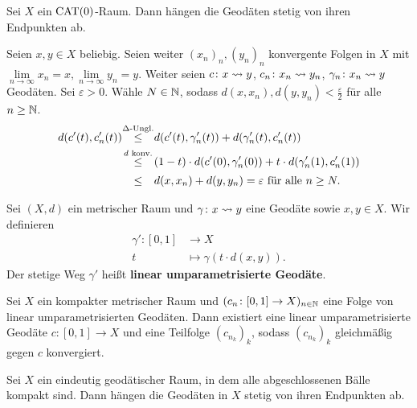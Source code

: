 \begin{satz}
\label{satz:2.18}
	Sei $X$ ein $\operatorname{CAT(0)}$-Raum.
	Dann hängen die Geodäten stetig von ihren Endpunkten ab.
\end{satz}

\begin{beweis}
	Seien $x,y \in X$ beliebig.
	Seien weiter $(x_n)_n, (y_n)_n$ konvergente Folgen in $X$ mit $\lim\limits_{n \rightarrow \infty} x_n = x, \lim\limits_{n \rightarrow \infty} y_n = y$.
	Weiter seien $c \colon x \rightsquigarrow y$, $c_n\colon x_n \rightsquigarrow y_n$, $\gamma_n \colon x_n \rightsquigarrow y$ Geodäten.
	Sei $\varepsilon > 0$.
	Wähle $N \in \mathbb{N}$, sodass $d(x,x_n), d(y,y_n) < \frac{\varepsilon}{2}$ für alle $n \geq \mathbb{N}$.
	\begin{align*}
		d(c'(t),c_n'(t)) &\stack{\Delta\text{-Ungl.}}{\leq} d(c'(t),\gamma_n'(t)) + d(\gamma_n'(t),c_n'(t)) \\
		&\stack{d\text{ konv.}}{\leq} (1-t) \cdot d(c'(0),\gamma_n'(0)) + t \cdot d(\gamma_n'(1),c_n'(1)) \\
		&\stack{}{\leq} d(x,x_n) + d(y,y_n) = \varepsilon \text{ für alle } n \geq N. 
	\end{align*}
\end{beweis}
	
\begin{definition}
\label{def:2.19}
	Sei $(X,d)$ ein metrischer Raum und $\gamma \colon x \rightsquigarrow y$ eine Geodäte sowie $x,y \in X$. 
	Wir definieren
	\begin{align*}
		\gamma'\colon [0,1] &\longrightarrow X \\
		t &\longmapsto \gamma(t \cdot d(x,y)).
	\end{align*}
	Der stetige Weg $\gamma'$ heißt \textbf{linear umparametrisierte Geodäte}. 
\end{definition}

\begin{korollar}
\label{kor:2.20}
	Sei $X$ ein kompakter metrischer Raum und $(c_n\colon [0,1] \rightarrow X)_{n \in \mathbb{N}}$ eine Folge von linear umparametrisierten Geodäten.
	Dann existiert eine linear umparametrisierte Geodäte $c \colon [0,1] \rightarrow X$ und eine Teilfolge $(c_{n_k})_k$, sodass $(c_{n_k})_k$ gleichmäßig gegen $c$ konvergiert.	
\end{korollar}

\begin{satz}
\label{satz:2.21}
	Sei $X$ ein eindeutig geodätischer Raum, in dem alle abgeschlossenen Bälle kompakt sind.
	Dann hängen die Geodäten in $X$ stetig von ihren Endpunkten ab.
\end{satz}

